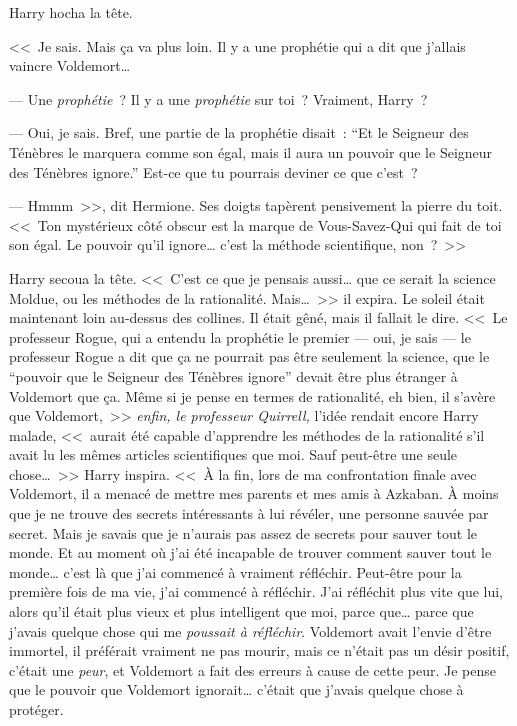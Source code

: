 Harry hocha la tête.

<<~Je sais. Mais ça va plus loin. Il y a une prophétie qui a dit que j'allais vaincre Voldemort…

--- Une \emph{prophétie}~? Il y a une \emph{prophétie} sur toi~? Vraiment, Harry~?

--- Oui, je sais. Bref, une partie de la prophétie disait~: “Et le Seigneur des Ténèbres le marquera comme son égal, mais il aura un pouvoir que le Seigneur des Ténèbres ignore.” Est-ce que tu pourrais deviner ce que c'est~?

--- Hmmm~>>, dit Hermione. Ses doigts tapèrent pensivement la pierre du toit. <<~Ton mystérieux côté obscur est la marque de Vous-Savez-Qui qui fait de toi son égal. Le pouvoir qu'il ignore… c'est la méthode scientifique, non~?~>>

Harry secoua la tête. <<~C'est ce que je pensais aussi… que ce serait la science Moldue, ou les méthodes de la rationalité. Mais…~>> il expira. Le soleil était maintenant loin au-dessus des collines. Il était gêné, mais il fallait le dire. <<~Le professeur Rogue, qui a entendu la prophétie le premier — oui, je sais — le professeur Rogue a dit que ça ne pourrait pas être seulement la science, que le “pouvoir que le Seigneur des Ténèbres ignore” devait être plus étranger à Voldemort que ça. Même si je pense en termes de rationalité, eh bien, il s'avère que Voldemort,~>> \emph{enfin, le professeur Quirrell,} l'idée rendait encore Harry malade, <<~aurait été capable d'apprendre les méthodes de la rationalité s'il avait lu les mêmes articles scientifiques que moi. Sauf peut-être une seule chose…~>> Harry inspira. <<~À la fin, lors de ma confrontation finale avec Voldemort, il a menacé de mettre mes parents et mes amis à Azkaban. À moins que je ne trouve des secrets intéressants à lui révéler, une personne sauvée par secret. Mais je savais que je n'aurais pas assez de secrets pour sauver tout le monde. Et au moment où j'ai été incapable de trouver comment sauver tout le monde… c'est là que j'ai commencé à vraiment réfléchir. Peut-être pour la première fois de ma vie, j'ai commencé à réfléchir. J'ai réfléchit plus vite que lui, alors qu'il était plus vieux et plus intelligent que moi, parce que… parce que j'avais quelque chose qui me \emph{poussait à réfléchir}. Voldemort avait l'envie d'être immortel, il préférait vraiment ne pas mourir, mais ce n'était pas un désir positif, c'était une \emph{peur}, et Voldemort a fait des erreurs à cause de cette peur. Je pense que le pouvoir que Voldemort ignorait… c'était que j'avais quelque chose à protéger.

